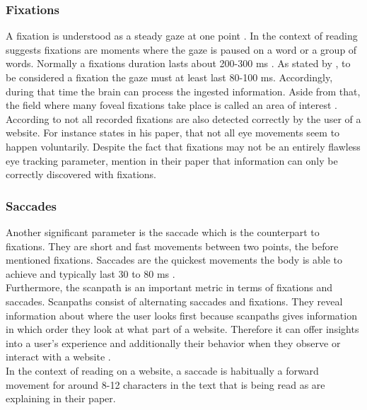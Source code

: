 \subsubsection{Fixations}
A fixation is understood as a steady gaze at one point \autocite[]{buscher2009you}.  In the context of reading \textcite[]{beymer2007eye} suggests fixations are moments where the gaze is paused on a word or a group of words. 
Normally a fixations duration lasts about 200-300 ms \autocite[]{kasneci2015online}. As stated by \textcite[]{buscher2009you}, to be considered a fixation the gaze must at least last 80-100 ms. Accordingly, during that time the brain can process the ingested information. Aside from that, the field where many foveal fixations take place is called an area of interest \autocite[]{djamasbi2014eye}.\\
According to \textcite[]{grzyb2016eye} not all recorded fixations are also detected correctly by the user of a website. For instance \textcite[]{bruneau2002eyes} states in his paper, that not all eye movements seem to happen voluntarily. 
Despite the fact that fixations may not be an entirely flawless eye tracking parameter, \textcite[]{biedert2010eyebook} mention in their paper that information can only be correctly discovered with fixations.

\subsubsection{Saccades}
Another significant parameter is the saccade which is the counterpart to fixations. They are short and fast movements between two points, the before mentioned fixations. Saccades are the quickest movements the body is able to achieve and typically last 30 to 80 ms \autocite[]{blascheck2014state}. \\
Furthermore, the scanpath is an important metric in terms of fixations and saccades. Scanpaths consist of alternating saccades and fixations. They reveal information about where the user looks first because scanpaths gives information in which order they look at what part of a website. Therefore it can offer insights into a user's experience and additionally their behavior when they observe or interact with a website \autocite[]{lorigo2008eye, blascheck2014state}.\\
In the context of reading on a website, a saccade is habitually a forward movement for around 8-12 characters in the text that is being read as \textcite[]{beymer2007eye} are explaining in their paper.

